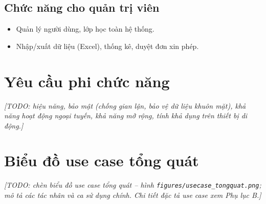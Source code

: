 \documentclass[../main.tex]{subfiles}
\begin{document}
\subsection{Chức năng cho quản trị viên}
\begin{itemize}
    \item Quản lý người dùng, lớp học toàn hệ thống.
    \item Nhập/xuất dữ liệu (Excel), thống kê, duyệt đơn xin phép.
\end{itemize}

\section{Yêu cầu phi chức năng}
\textit{[TODO: hiệu năng, bảo mật (chống gian lận, bảo vệ dữ liệu khuôn mặt), khả năng hoạt động ngoại tuyến, khả năng mở rộng, tính khả dụng trên thiết bị di động.]}

\section{Biểu đồ use case tổng quát}
\textit{[TODO: chèn biểu đồ use case tổng quát -- hình \texttt{figures/usecase\_tongquat.png}; mô tả các tác nhân và ca sử dụng chính. Chi tiết đặc tả use case xem Phụ lục B.]}
\end{document}

